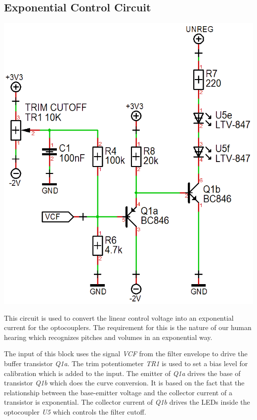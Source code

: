 \documentclass{scrartcl}
\begin{document}
\subsection{Exponential Control Circuit}

\begin{center}
    \includegraphics[scale=0.42]{assets/schema-expo.png}
\end{center}

This circuit is used to convert the linear control voltage into an exponential current for the optocouplers. The requirement for this is the nature of our human hearing which recognizes pitches and volumes in an exponential way.

The input of this block uses the signal \emph{VCF} from the filter envelope to drive the buffer transistor \emph{Q1a}. The trim potentiometer \emph{TR1} is used to set a bias level for calibration which is added to the input. The emitter of \emph{Q1a} drives the base of transistor \emph{Q1b} which does the curve conversion. It is based on the fact that the relationship between the base-emitter voltage and the collector current of a transistor is exponential. The collector current of \emph{Q1b} drives the LEDs inside the optocoupler \emph{U5} which controls the filter cutoff.
\end{document}
